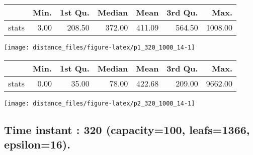 \documentclass[
  9pt,
  landscape]{article}
\begin{document}
\begin{minipage}{0.5\textwidth} 
\centering 
\begin{tabular}{rrrrrrr}
  \hline
 & Min. & 1st Qu. & Median & Mean & 3rd Qu. & Max. \\ 
  \hline
stats & 3.00 & 208.50 & 372.00 & 411.09 & 564.50 & 1008.00 \\ 
   \hline
\end{tabular}
\vspace{0.5cm} 


\texttt{[image: distance\_files/figure-latex/p1\_320\_1000\_14-1]} 

\end{minipage} 
\begin{minipage}{0.5\textwidth} 
\centering 
\begin{tabular}{rrrrrrr}
  \hline
 & Min. & 1st Qu. & Median & Mean & 3rd Qu. & Max. \\ 
  \hline
stats & 0.00 & 35.00 & 78.00 & 422.68 & 209.00 & 9662.00 \\ 
   \hline
\end{tabular}
\vspace{0.5cm} 


\texttt{[image: distance\_files/figure-latex/p2\_320\_1000\_14-1]} 

\end{minipage}

\pagebreak

\hypertarget{time-instant-320-capacity100-leafs1366-epsilon16.}{%
\subsection{Time instant : 320 (capacity=100, leafs=1366,
epsilon=16).}\label{time-instant-320-capacity100-leafs1366-epsilon16.}}
\end{document}
